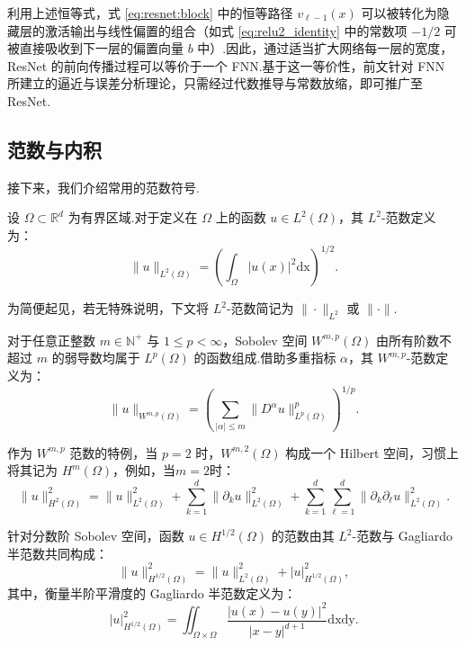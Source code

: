利用上述恒等式，式 \eqref{eq:resnet:block} 中的恒等路径 $v_{\ell-1}(x)$ 可以被转化为隐藏层的激活输出与线性偏置的组合（如式 \eqref{eq:relu2_identity} 中的常数项 $-1/2$ 可被直接吸收到下一层的偏置向量 $b$ 中）.因此，通过适当扩大网络每一层的宽度，ResNet 的前向传播过程可以等价于一个 FNN.基于这一等价性，前文针对 FNN 所建立的逼近与误差分析理论，只需经过代数推导与常数放缩，即可推广至 ResNet.

\subsection{范数与内积}
接下来，我们介绍常用的范数符号.
\begin{definition}[范数与内积]
设 $\Omega \subset \mathbb{R}^d$ 为有界区域.对于定义在 $\Omega$ 上的函数 $u\in L^2(\Omega)$，其 $L^2$-范数定义为：
\begin{equation*}
\|u\|_{L^2(\Omega)} = \left( \int_{\Omega} |u(x)|^2 \text{dx} \right)^{1/2}.
\end{equation*}

为简便起见，若无特殊说明，下文将 $L^2$-范数简记为 $\|\cdot\|_{L^2}$ 或 $\|\cdot\|$.

对于任意正整数 $m \in \mathbb{N}^+$ 与 $1 \le p < \infty$，Sobolev 空间 $W^{m,p}(\Omega)$ 由所有阶数不超过 $m$ 的弱导数均属于 $L^p(\Omega)$ 的函数组成.借助多重指标 $\alpha$，其 $W^{m,p}$-范数定义为：
$$\|u\|_{W^{m,p}(\Omega)} = \left( \sum_{|\alpha| \le m} \|D^\alpha u\|_{L^p(\Omega)}^p \right)^{1/p}.$$

作为 $W^{m,p}$ 范数的特例，当 $p=2$ 时，$W^{m,2}(\Omega)$ 构成一个 Hilbert 空间，习惯上将其记为 $H^m(\Omega)$，例如，当$m=2$时：
\begin{equation*}
\|u\|_{H^2(\Omega)}^2 = \|u\|_{L^2(\Omega)}^2 + \sum_{k=1}^d \|\partial_k u\|_{L^2(\Omega)}^2 + \sum_{k=1}^d \sum_{\ell=1}^d \|\partial_k \partial_\ell u\|_{L^2(\Omega)}^2.
\end{equation*}

针对分数阶 Sobolev 空间，函数 $u \in H^{1/2}(\Omega)$ 的范数由其 $L^2$-范数与 Gagliardo 半范数共同构成：
\begin{equation*}
\|u\|_{H^{1/2}(\Omega)}^2 = \|u\|_{L^2(\Omega)}^2 + |u|_{H^{1/2}(\Omega)}^2,
\end{equation*}
其中，衡量半阶平滑度的 Gagliardo 半范数定义为：
\begin{equation*}
|u|_{H^{1/2}(\Omega)}^2 = \iint_{\Omega \times \Omega} \frac{|u(x) - u(y)|^2}{|x - y|^{d+1}} \text{dxdy}.
\end{equation*}


\end{definition}
